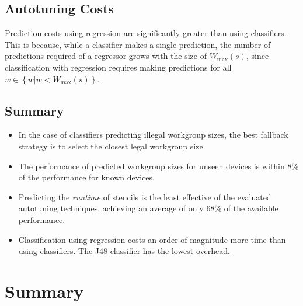 \subsection{Autotuning Costs}\label{subsec:autotune-costs}

Prediction costs using regression are significantly greater than using
classifiers. This is because, while a classifier makes a single
prediction, the number of predictions required of a regressor grows
with the size of $W_{\max}(s)$, since classification with regression
requires making predictions for all
$w \in \left\{ w | w < W_{\max}(s) \right\}$.




\subsection{Summary}

%
\begin{itemize}
\item In the case of classifiers predicting illegal workgroup sizes,
  the best fallback strategy is to select the closest legal workgroup
  size.
\item The performance of predicted workgroup sizes for unseen devices
  is within 8\% of the performance for known devices.
\item Predicting the \emph{runtime} of stencils is the least effective
  of the evaluated autotuning techniques, achieving an average of only
  68\% of the available performance.
\item Classification using regression costs an order of magnitude more
  time than using classifiers. The J48 classifier has the lowest
  overhead.
\end{itemize}
%

\section{Summary}

% 

% 
